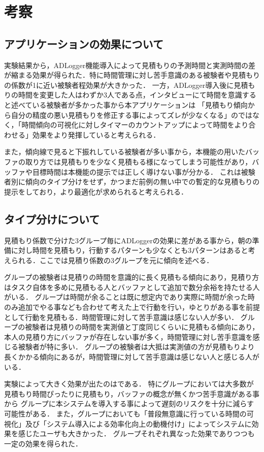 \section{考察}
\subsection{アプリケーションの効果について}
実験結果から，ADLogger機能導入によって見積もりの予測時間と実測時間の差が縮まる効果が得られた．特に時間管理に対し苦手意識のある被験者や見積もりの係数が1に近い被験者程効果が大きかった．
一方，ADLogger導入後に見積もりの時間を変更した人はわずか3人である点，インタビューにて時間を意識すると述べている被験者が多かった事から本アプリケーションは
「見積もり傾向から自分の精度の悪い見積もりを修正する事によってズレが少なくなる」のではなく，「時間傾向の可視化に対しタイマーのカウントアップによって時間をより合わせる」効果をより発揮していると考えられる．

また，傾向線で見ると下振れしている被験者が多い事から，本機能の用いたバッファの取り方では見積もりを少なく見積もる様になってしまう可能性があり，バッファや目標時間は本機能の提示では正しく導けない事が分かる．
これは被験者別に傾向のタイプ分けをせず，かつまだ前例の無い中での暫定的な見積もりの提示をしており，より最適化が求められると考えられる．

\subsection{タイプ分けについて}
見積もり係数で分けた3グループ毎にADLoggerの効果に差がある事から，朝の準備に対し時間を見積もり，行動するパターンも少なくとも3パターンはあると考えられる．ここでは見積り係数の3グループを元に傾向を述べる．

グループの被験者は見積りの時間を意識的に長く見積もる傾向にあり，見積り方はタスク自体を多めに見積もる人とバッファとして追加で数分余裕を持たせる人がいる．
グループは時間が余ることは既に想定内であり実際に時間が余った時のみ追加でやる事なども合わせて考えた上で行動を行い，ゆとりがある事を前提として行動を見積もる．時間管理に対して苦手意識は感じない人が多い．
グループの被験者は見積りの時間を実測値と丁度同じくらいに見積もる傾向にあり，本人の見積り方にバッファが存在しない事が多く，時間管理に対し苦手意識を感じる被験者が特に多い．
グループの被験者は大抵は実測値の方が見積もりより長くかかる傾向にあるが，時間管理に対して苦手意識は感じない人と感じる人がいる．

実験によって大きく効果が出たのはである．
特にグループにおいては大多数が見積もり時間ぴったりに見積もり，バッファの概念が無くかつ苦手意識がある事から
グループに本システムを導入する事によって遅刻のリスクを十分に減らす可能性がある．
また，グループにおいても「普段無意識に行っている時間の可視化」及び「システム導入による効率化向上の動機付け」によってシステムに効果を感じたユーザも大きかった．
グループそれぞれ異なった効果でありつつも一定の効果を得られた．